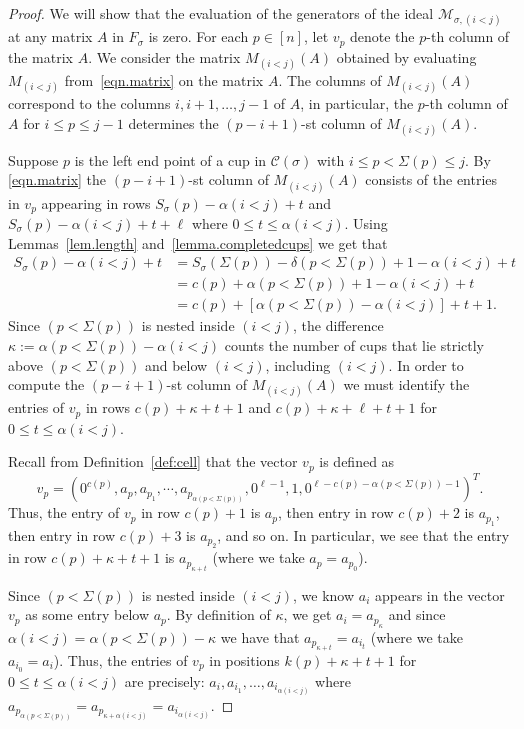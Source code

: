 \documentclass[11pt]{amsart}
\theoremstyle{remark}
\theoremstyle{remark}
\theoremstyle{definition}
\theoremstyle{definition}
\theoremstyle{definition}
\numberwithin{equation}{section}
\newcommand{\ga}{\alpha}
\newcommand{\gs}{\sigma}
\newcommand{\cc}{\mathcal{C}}
\newcommand{\cm}{\mathcal{M}}
\newcommand{\al}{\alpha}
\newcommand{\E}{\Sigma}
\newcommand{\cupsigma}{\cc(\gs)}
\newcommand{\cell}{F_\gs}
\begin{document}
\begin{proof} We will show that the evaluation of the generators of the ideal $\cm_{\gs, (i<j)}$ at any matrix $A$ in $\cell$ is zero. For each $p\in [n]$, let $v_p$ denote the $p$-th column of the matrix $A$. We consider the matrix $M_{(i<j)}(A)$ obtained by evaluating $M_{(i<j)}$ from~\eqref{eqn.matrix} on the matrix $A$. The columns of $M_{(i<j)}(A)$ correspond to the columns $i, i+1, \ldots, j-1$ of $A$, in particular, the $p$-th column of $A$ for $i\leq p \leq j-1$ determines the $(p-i+1)$-st column of $M_{(i<j)}(A)$.

Suppose $p$ is the left end point of a cup in $\cupsigma$ with $i\leq p<\E(p)
\leq j$. By \eqref{eqn.matrix} the $(p-i+1)$-st column of $M_{(i<j)}(A)$ consists of the entries in $v_p$ appearing in rows $S_\gs(p)-\ga(i<j)+t$ and $S_\gs(p)-\ga(i<j)+t+\ell$ where $0\leq t\leq\ga(i<j)$. Using Lemmas~\ref{lem.length} and~\ref{lemma.completedcups} we get that
\begin{align*}
S_\gs(p)-\ga(i<j)+t &= S_\gs(\E(p)) -\delta(p<\E(p)) +1 - \al(i<j) +t \\
& =  c(p) + \al(p<\E(p)) +1 -\al(i<j)+t \\
&=c(p)+\left[\ga(p<\E(p))-\ga(i<j)\right]+t+1.
\end{align*}
Since $(p<\E(p))$ is nested inside $(i<j)$, the difference $\kappa:=\ga(p<\E(p))-\ga(i<j)$ counts the number of cups that lie strictly above $(p<\E(p))$ and below $(i<j)$, including $(i<j)$. In order to compute the $(p-i+1)$-st column of $M_{(i<j)}(A)$ we must identify the entries of $v_p$ in rows $c(p)+\kappa+t+1$ and $c(p)+\kappa +\ell +t+1$ for $0\leq t \leq \al(i<j)$.



Recall from Definition~\ref{def:cell} that the vector $v_p$ is defined as 
\[
v_p=\left(0^{c(p)},a_p,a_{p_1},\cdots,a_{p_{\ga(p<\E(p))}},0^{\ell-1},1,0^{\ell-c(p)-\ga(p<\E(p))-1}\right)^T.
\]
Thus, the entry of $v_p$ in row $c(p)+1$ is $a_p$, then entry in row $c(p)+2$ is $a_{p_1}$, then entry in row $c(p)+3$ is $a_{p_2}$, and so on. In particular, we see that the entry in row $c(p) + \kappa + t +1$ is $a_{p_{\kappa+t}}$ (where we take  $a_p=a_{p_0}$).  


Since $(p<\E(p))$ is nested inside $(i<j)$, we know $a_i$ appears in the vector $v_p$ as some entry below $a_p$. By definition of $\kappa$, we get $a_i = a_{p_\kappa}$ and since $\ga(i<j)=\ga(p<\E(p))-\kappa$ we have that $a_{p_{\kappa+t}}=a_{i_{t}}$ (where we take $a_{i_0}=a_i$). Thus, the entries of $v_p$ in positions $k(p)+\kappa+t+1$ for $0\leq t \leq \al(i<j)$ are precisely: $a_i, a_{i_1}, \ldots, a_{i_{\ga(i<j)}}$ where $a_{p_{\al(p<\E(p))}} = a_{p_{\kappa+\al(i<j)}} = a_{i_{\al(i<j)}}$.


\end{proof}
\end{document}
